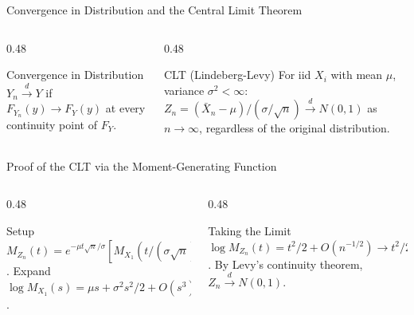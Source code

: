 \documentclass[aspectratio=169,xcolor={dvipsnames,table}]{beamer}
\begin{document}
\begin{frame}{Convergence in Distribution and the Central Limit Theorem}
	\vspace{-0.15cm}
	\begin{columns}[T]
		\begin{column}{0.48\textwidth}
			\begin{block}{Convergence in Distribution}
				\footnotesize
				$Y_n \xrightarrow{d} Y$ if $F_{Y_n}(y)\to F_Y(y)$ at every continuity point of $F_Y$.
			\end{block}
		\end{column}
		\begin{column}{0.48\textwidth}
			\begin{alertblock}{CLT (Lindeberg-Levy)}
				\footnotesize
				For iid $X_i$ with mean $\mu$, variance $\sigma^2<\infty$: $Z_n=(\bar X_n-\mu)/(\sigma/\sqrt n) \xrightarrow{d} N(0,1)$ as $n\to\infty$, regardless of the original distribution.
			\end{alertblock}
		\end{column}
	\end{columns}
\end{frame}

\begin{frame}{Proof of the CLT via the Moment-Generating Function}
	\vspace{-0.15cm}
	\begin{columns}[T]
		\begin{column}{0.48\textwidth}
			\begin{block}{Setup}
				\footnotesize
				$M_{Z_n}(t) = e^{-\mu t\sqrt n/\sigma}[M_{X_1}(t/(\sigma\sqrt n))]^n$. Expand $\log M_{X_1}(s) = \mu s + \sigma^2 s^2/2 + O(s^3)$.
				\end{block}
		\end{column}
		\begin{column}{0.48\textwidth}
			\begin{alertblock}{Taking the Limit}
				\footnotesize
				$\log M_{Z_n}(t) = t^2/2 + O(n^{-1/2}) \to t^2/2$. By Levy's continuity theorem, $Z_n \xrightarrow{d} N(0,1)$.
			\end{alertblock}
		\end{column}
	\end{columns}
\end{frame}
\end{document}
